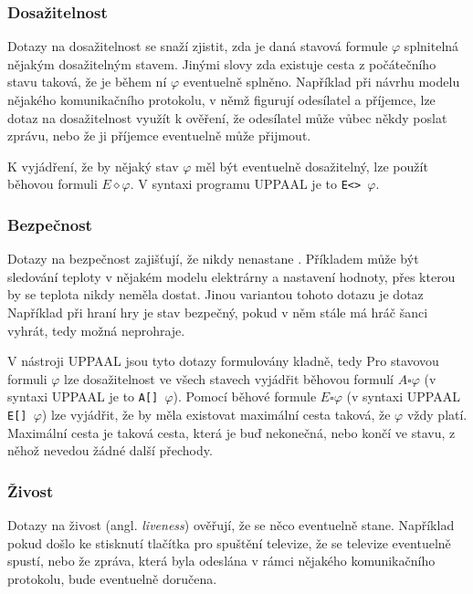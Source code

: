 \subsubsection{Dosažitelnost}
Dotazy na dosažitelnost se snaží zjistit, zda je daná stavová formule $\varphi$ splnitelná nějakým dosažitelným stavem. Jinými slovy zda existuje cesta z počátečního stavu taková, že je během ní $\varphi$ eventuelně splněno. Například při návrhu modelu nějakého komunikačního protokolu, v němž figurují odesílatel a příjemce, lze dotaz na dosažitelnost využít k ověření, že odesílatel může vůbec někdy poslat zprávu, nebo že ji příjemce eventuelně může přijmout.

K vyjádření, že by nějaký stav $\varphi$ měl být eventuelně dosažitelný, lze použít běhovou formuli $E \diamond \varphi$. V syntaxi programu UPPAAL je to \texttt{E<> $\varphi$}.

\subsubsection{Bezpečnost}
Dotazy na bezpečnost zajišťují, že nikdy nenastane . Příkladem může být sledování teploty v nějakém modelu elektrárny a nastavení hodnoty, přes kterou by se teplota nikdy neměla dostat. Jinou variantou tohoto dotazu je dotaz  Například při hraní hry je stav bezpečný, pokud v něm stále má hráč šanci vyhrát, tedy možná neprohraje.

V nástroji UPPAAL jsou tyto dotazy formulovány kladně, tedy  Pro stavovou formuli $\varphi$ lze dosažitelnost ve všech stavech vyjádřit běhovou formulí $A \square \varphi$ (v syntaxi UPPAAL je to \texttt{A[] $\varphi$}). Pomocí běhové formule $E \square \varphi$ (v syntaxi UPPAAL \texttt{E[] $\varphi$}) lze vyjádřit, že by měla existovat maximální cesta taková, že $\varphi$ vždy platí. Maximální cesta je taková cesta, která je buď nekonečná, nebo končí ve stavu, z něhož nevedou žádné další přechody.

\subsubsection{Živost}
Dotazy na živost (angl. \textit{liveness}) ověřují, že se něco eventuelně stane. Například pokud došlo ke stisknutí tlačítka pro spuštění televize, že se televize eventuelně spustí, nebo že zpráva, která byla odeslána v rámci nějakého komunikačního protokolu, bude eventuelně doručena.

